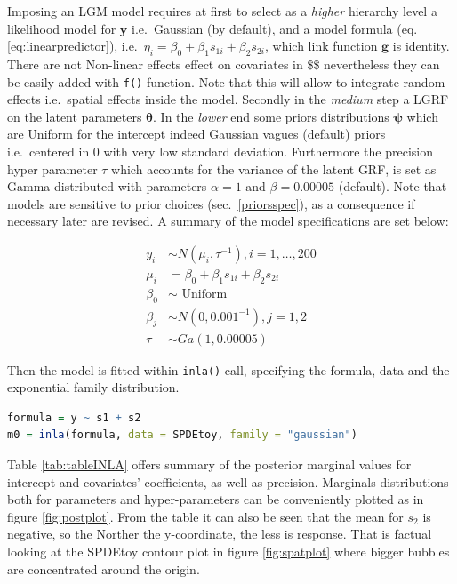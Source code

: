 \documentclass[
  12pt,
  a4paper,
  oneside]{book}
\newcommand{\passthrough}[1]{#1}
\theoremstyle{definition}
\theoremstyle{definition}
\theoremstyle{definition}
\theoremstyle{remark}
\begin{document}
Imposing an LGM model requires at first to select as a \emph{higher} hierarchy level a likelihood model for \(\mathbf{y}\) i.e.~Gaussian (by default), and a model formula (eq. \eqref{eq:linearpredictor}), i.e.~\(\eta_{i}=\beta_{0}+\beta_{1} s_{1 i}+\beta_{2} s_{2 i}\), which link function \(\mathbf{g}\) is identity. There are not Non-linear effects effect on covariates in \$\eta \$ nevertheless they can be easily added with \passthrough{\lstinline!f()!} function. Note that this will allow to integrate random effects i.e.~spatial effects inside the model. Secondly in the \emph{medium} step a LGRF on the latent parameters \(\boldsymbol\theta\). In the \emph{lower} end some priors distributions \(\boldsymbol\psi\) which are Uniform for the intercept indeed Gaussian vagues (default) priors i.e.~centered in 0 with very low standard deviation. Furthermore the precision hyper parameter \(\tau\) which accounts for the variance of the latent GRF, is set as Gamma distributed with parameters \(\alpha = 1\) and \(\beta = 0.00005\) (default). Note that models are sensitive to prior choices (sec.~\ref{priorsspec}), as a consequence if necessary later are revised.
A summary of the model specifications are set below:

\begin{equation} 
\begin{split}
y_{i} & \sim N\left(\mu_{i}, \tau^{-1}\right), i=1, \ldots, 200 \\
\mu_{i} &=\beta_{0}+\beta_{1} s_{1 i}+\beta_{2} s_{2 i} \\
\beta_{0} & \sim \text { Uniform } \\
\beta_{j} & \sim N\left(0,0.001^{-1}\right), j=1,2 \\
\tau & \sim G a(1,0.00005)
\end{split}
\end{equation}

Then the model is fitted within \passthrough{\lstinline!inla()!} call, specifying the formula, data and the exponential family distribution.

\begin{lstlisting}[language=R]
formula = y ~ s1 + s2
m0 = inla(formula, data = SPDEtoy, family = "gaussian")
\end{lstlisting}

Table \ref{tab:tableINLA} offers summary of the posterior marginal values for intercept and covariates' coefficients, as well as precision. Marginals distributions both for parameters and hyper-parameters can be conveniently plotted as in figure \ref{fig:postplot}. From the table it can also be seen that the mean for \(s_2\) is negative, so the Norther the y-coordinate, the less is response. That is factual looking at the SPDEtoy contour plot in figure \ref{fig:spatplot} where bigger bubbles are concentrated around the origin.
\end{document}
